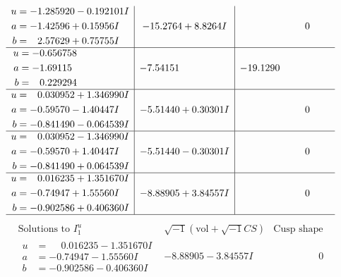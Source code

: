 \documentclass[1p]{elsarticle_modified}
\theoremstyle{definition}
\newcommand{\I}{\sqrt{-1}}
\begin{document}
$$\begin{array}{c|c|c}
\begin{aligned}
u &= -1.285920 - 0.192101 I \\
a &= -1.42596 + 0.15956 I \\
b &= \phantom{-}2.57629 + 0.75755 I\end{aligned}
 & -15.2764 + 8.8264 I & \phantom{-0.000000 } 0 \\ \hline\begin{aligned}
u &= -0.656758\phantom{ +0.000000I} \\
a &= -1.69115\phantom{ +0.000000I} \\
b &= \phantom{-}0.229294\phantom{ +0.000000I}\end{aligned}
 & -7.54151\phantom{ +0.000000I} & -19.1290\phantom{ +0.000000I} \\ \hline\begin{aligned}
u &= \phantom{-}0.030952 + 1.346990 I \\
a &= -0.59570 - 1.40447 I \\
b &= -0.841490 - 0.064539 I\end{aligned}
 & -5.51440 + 0.30301 I & \phantom{-0.000000 } 0 \\ \hline\begin{aligned}
u &= \phantom{-}0.030952 - 1.346990 I \\
a &= -0.59570 + 1.40447 I \\
b &= -0.841490 + 0.064539 I\end{aligned}
 & -5.51440 - 0.30301 I & \phantom{-0.000000 } 0 \\ \hline\begin{aligned}
u &= \phantom{-}0.016235 + 1.351670 I \\
a &= -0.74947 + 1.55560 I \\
b &= -0.902586 + 0.406360 I\end{aligned}
 & -8.88905 + 3.84557 I & \phantom{-0.000000 } 0\\
 \hline 
 \end{array}$$\newpage$$\begin{array}{c|c|c}  
\text{Solutions to }I^u_{1}& \I (\text{vol} + \sqrt{-1}CS) & \text{Cusp shape}\\
 \hline 
\begin{aligned}
u &= \phantom{-}0.016235 - 1.351670 I \\
a &= -0.74947 - 1.55560 I \\
b &= -0.902586 - 0.406360 I\end{aligned}
 & -8.88905 - 3.84557 I & \phantom{-0.000000 } 0 \\ \hline\begin{aligned}

\end{aligned}
\end{array}$$
\end{document}
